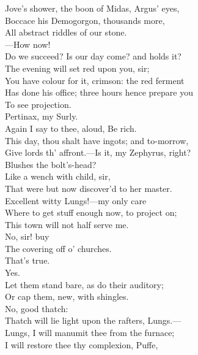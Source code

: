 \documentclass[a4paper,oneside]{memoir}
\begin{document}
\begin{drama*}
Jove's shower, the boon of Midas, Argus' eyes,\\
Boccace his Demogorgon, thousands more,\\
All abstract riddles of our stone.\\
 ---How now!\\
Do we succeed? Is our day come? and holds it?\\
\facespeaks The evening will set red upon you, sir;\\
You have colour for it, crimson: the red ferment\\
Has done his office; three hours hence prepare you\\
To see projection.\\
\mammonspeaks {} Pertinax, my Surly.\\
Again I say to thee, aloud, Be rich.\\
This day, thou shalt have ingots; and to-morrow,\\
Give lords th' affront.---Is it, my Zephyrus, right?\\
Blushes the bolt's-head?\\
\facespeaks {} Like a wench with child, sir,\\
That were but now discover'd to her master.\\
\mammonspeaks Excellent witty Lungs!---my only care\\
Where to get stuff enough now, to project on;\\
This town will not half serve me.\\
\facespeaks {} No, sir! buy\\
The covering off o' churches.\\
\mammonspeaks {} That's true.\\
\facespeaks {} Yes.\\
Let them stand bare, as do their auditory;\\
Or cap them, new, with shingles.\\
\mammonspeaks {} No, good thatch:\\
Thatch will lie light upon the rafters, Lungs.---\\
Lungs, I will manumit thee from the furnace;\\
I will restore thee thy complexion, Puffe,\\

\end{drama*}
\end{document}

